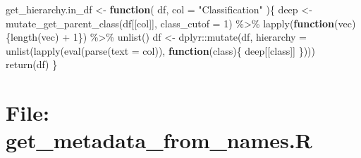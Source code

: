 \documentclass[
]{article}
\newenvironment{Shaded}{\begin{snugshade}}{\end{snugshade}}
\newcommand{\AttributeTok}[1]{\textcolor[rgb]{0.77,0.63,0.00}{#1}}
\newcommand{\ControlFlowTok}[1]{\textcolor[rgb]{0.13,0.29,0.53}{\textbf{#1}}}
\newcommand{\DecValTok}[1]{\textcolor[rgb]{0.00,0.00,0.81}{#1}}
\newcommand{\FunctionTok}[1]{\textcolor[rgb]{0.00,0.00,0.00}{#1}}
\newcommand{\NormalTok}[1]{#1}
\newcommand{\OtherTok}[1]{\textcolor[rgb]{0.56,0.35,0.01}{#1}}
\newcommand{\SpecialCharTok}[1]{\textcolor[rgb]{0.00,0.00,0.00}{#1}}
\newcommand{\StringTok}[1]{\textcolor[rgb]{0.31,0.60,0.02}{#1}}
\begin{document}
\begin{Shaded}
\begin{Highlighting}[]
\NormalTok{get\_hierarchy.in\_df }\OtherTok{\textless{}{-}} 
  \ControlFlowTok{function}\NormalTok{(}
\NormalTok{           df,}
           \AttributeTok{col =} \StringTok{"Classification"}
\NormalTok{           )\{}
\NormalTok{    deep }\OtherTok{\textless{}{-}} \FunctionTok{mutate\_get\_parent\_class}\NormalTok{(df[[col]], }\AttributeTok{class\_cutof =} \DecValTok{1}\NormalTok{) }\SpecialCharTok{\%\textgreater{}\%} 
      \FunctionTok{lapply}\NormalTok{(}\ControlFlowTok{function}\NormalTok{(vec)\{}\FunctionTok{length}\NormalTok{(vec) }\SpecialCharTok{+} \DecValTok{1}\NormalTok{\}) }\SpecialCharTok{\%\textgreater{}\%} 
      \FunctionTok{unlist}\NormalTok{()}
\NormalTok{    df }\OtherTok{\textless{}{-}}\NormalTok{ dplyr}\SpecialCharTok{::}\FunctionTok{mutate}\NormalTok{(df, }\AttributeTok{hierarchy =} \FunctionTok{unlist}\NormalTok{(}\FunctionTok{lapply}\NormalTok{(}\FunctionTok{eval}\NormalTok{(}\FunctionTok{parse}\NormalTok{(}\AttributeTok{text =}\NormalTok{ col)),}
                                           \ControlFlowTok{function}\NormalTok{(class)\{}
\NormalTok{                                             deep[[class]]}
\NormalTok{                                           \})))}
    \FunctionTok{return}\NormalTok{(df)}
\NormalTok{  \}}
\end{Highlighting}
\end{Shaded}

\hypertarget{file-get_metadata_from_names.r}{%
\section{File: get\_metadata\_from\_names.R}\label{file-get_metadata_from_names.r}}
\end{document}
